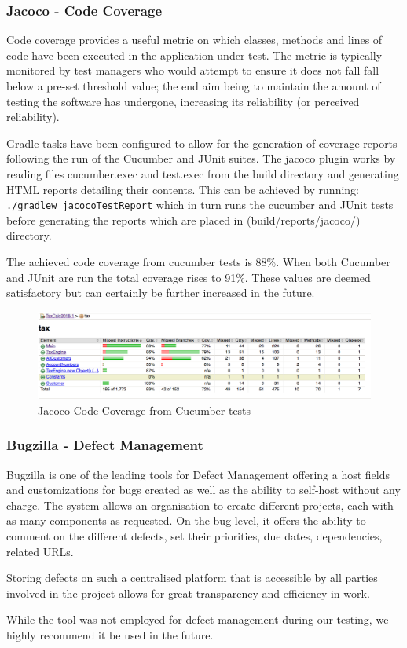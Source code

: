 \subsubsection{Jacoco - Code Coverage}
Code coverage provides a useful metric on which classes, methods and lines of code have been executed in the application under test. 
The metric is typically monitored by test managers who would attempt to ensure it does not fall fall below a pre-set threshold value; the end aim being to maintain the amount of testing the software has undergone, increasing its  reliability (or perceived reliability).  
\par
Gradle tasks have been configured to allow for the generation of coverage reports following the run of the Cucumber and JUnit suites. The jacoco plugin works by reading files cucumber.exec and test.exec from the build directory and generating HTML reports detailing their contents. This can be achieved by running: 
\lstinline{./gradlew jacocoTestReport} which in turn runs the cucumber and JUnit tests before generating the reports which are placed in (build/reports/jacoco/) directory. 
\par 
The achieved code coverage from cucumber tests is 88\%. 
When both Cucumber and JUnit are run the total coverage rises to 91\%. These values are deemed satisfactory but can certainly be further increased in the future.
\begin{figure}[H]
\centering
\includegraphics[scale=0.4]{res/cucumber-coverage.png}
\caption{Jacoco Code Coverage from Cucumber tests}
\end{figure}

\subsubsection{Bugzilla - Defect Management}
Bugzilla is one of the leading tools for Defect Management offering a host fields and customizations for bugs created as well as the ability to self-host without any charge. 
The system allows an organisation to create different projects, each with as many components as requested. On the bug level, it offers the ability to comment on the different defects, set their priorities, due dates, dependencies, related URLs.
\par 
Storing defects on such a centralised platform that is accessible by all parties involved in the project allows for great transparency and efficiency in work. 
\par 
While the tool was not employed for defect management during our testing, we highly recommend it be used in the future. 